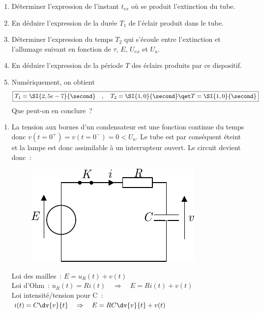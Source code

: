 \documentclass[a4paper, 10pt, garamond, oneside]{book}
\begin{document}
{\begin{enumerate}
		      \noindent
		      On utilisera la condition $r \ll R$ pour simplifier l'expression. Et on supposera que $v(t) \gg (r/R)E$ durant cette phase. Montrer que l'expression précédente devient alors
		      \[
			      0 = rC \dv{v}{t} + v
		      \]
		      \noindent
		      En déduire alors l'expression de $v(t)$.
		\item
		      Déterminer l'expression de l'instant $t_{ex}$ où se produit l'extinction du tube.
		\item
		      En déduire l'expression de la durée $T_1$ de l'éclair produit dans le tube.
		\item
		      Déterminer l'expression du temps $T_2$ qui s'écoule entre l'extinction et l'allumage suivant en fonction de $\tau$, $E$, $U_{ex}$  et $U_{a}$.
		\item
		      En déduire l'expression de la période $T$ des éclairs produits par ce dispositif.
		\item
		      Numériquement, on obtient
		      \[
			      \boxed{	T_1 = \SI{2,5e-7}{\second} \quad , \quad T_2 = \SI{1,0}{\second} \qet T = \SI{1,0}{\second}}
		      \]
		      Que peut-on en conclure~?
	\end{enumerate}
}{
	\begin{enumerate}
		\item
		      La tension aux bornes d'un condensateur est une fonction continue du
          temps donc $v(t=0^+)=v(t=0^-)=0<U_{a}$. Le tube est par conséquent
          éteint et la lampe est donc assimilable à un interrupteur ouvert. Le
          circuit devient donc~:
		      \begin{figure}[htbp]
			      \centering
			      \includegraphics[width=.4\linewidth]{balise_1}
		      \end{figure}

		      Loi des mailles~:
          $E = u_{R}(t) + v(t)$
          \\
		      Loi d'Ohm~:
          $u_{R}(t) = Ri(t)
          \quad \Rightarrow \quad
          E = Ri(t) + v(t)$
          \\
		      Loi intensité/tension pour C~:
          $i(t)=C \dv{v}{t}
          \quad \Rightarrow \quad
          E = RC \dv{v}{t} + v(t)$


\end{enumerate}}
\end{document}
